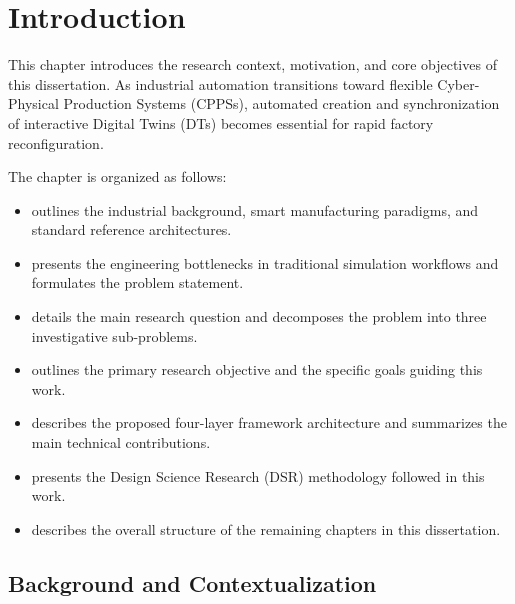 
%

\chapter{Introduction}
\label{cha:introduction}

This chapter introduces the research context, motivation, and core objectives of this dissertation. As industrial automation transitions toward flexible Cyber-Physical Production Systems (\glspl{CPPS}), automated creation and synchronization of interactive Digital Twins (\glspl{DT}) becomes essential for rapid factory reconfiguration.

The chapter is organized as follows:
\begin{itemize}
    \item {} outlines the industrial background, smart manufacturing paradigms, and standard reference architectures.
    \item {} presents the engineering bottlenecks in traditional simulation workflows and formulates the problem statement.
    \item {} details the main research question and decomposes the problem into three investigative sub-problems.
    \item {} outlines the primary research objective and the specific goals guiding this work.
    \item {} describes the proposed four-layer framework architecture and summarizes the main technical contributions.
    \item {} presents the Design Science Research (\gls{DSR}) methodology followed in this work.
    \item {} describes the overall structure of the remaining chapters in this dissertation.
\end{itemize}

\section{Background and Contextualization}
\label{sec:background}


